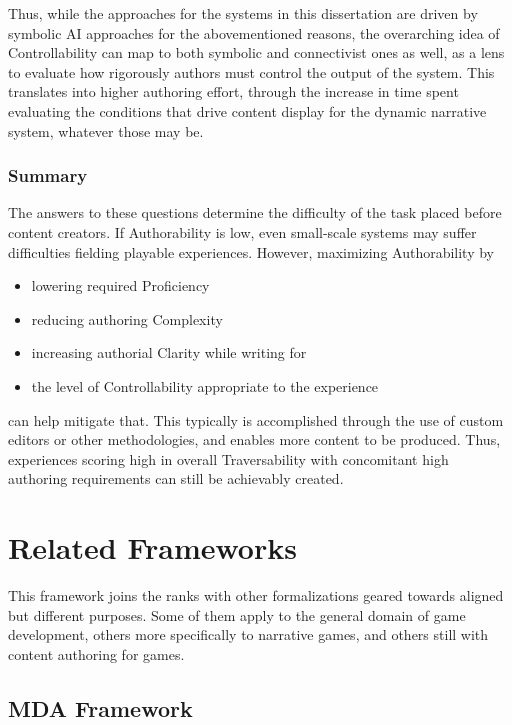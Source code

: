 Thus, while the approaches for the systems in this dissertation are driven by symbolic AI approaches for the abovementioned reasons, the overarching idea of Controllability can map to both symbolic and connectivist ones as well, as a lens to evaluate how rigorously authors must control the output of the system. This translates into higher authoring effort, through the increase in time spent evaluating the conditions that drive content display for the dynamic narrative system, whatever those may be.

\subsubsection{Summary}

The answers to these questions determine the difficulty of the task placed before content creators. If Authorability is low, even small-scale systems may suffer difficulties fielding playable experiences. However, maximizing Authorability by

\begin{itemize}
    \item lowering required Proficiency
    \item reducing authoring Complexity
    \item increasing authorial Clarity while writing for
    \item the level of Controllability appropriate to the experience
\end{itemize}

can help mitigate that. This typically is accomplished through the use of custom editors or other methodologies, and enables more content to be produced. Thus, experiences scoring high in overall Traversability with concomitant high authoring requirements can still be achievably created.

\section*{Related Frameworks}

This framework joins the ranks with other formalizations geared towards aligned but different purposes. Some of them apply to the general domain of game development, others more specifically to narrative games, and others still with content authoring for games.

\subsection{MDA Framework}

